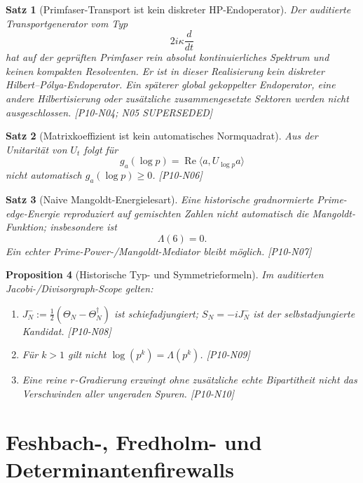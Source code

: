 \documentclass[11pt,a4paper]{amsart}
\newtheorem{theorem}{Satz}[section]
\newtheorem{proposition}[theorem]{Proposition}
\begin{document}
\begin{theorem}[Primfaser-Transport ist kein diskreter HP-Endoperator]
\label{thm:n04}
Der auditierte Transportgenerator vom Typ
\[
  2i\kappa\frac{d}{dt}
\]
hat auf der geprüften Primfaser rein absolut kontinuierliches Spektrum und
keinen kompakten Resolventen. Er ist in dieser Realisierung kein diskreter
Hilbert--Pólya-Endoperator. Ein späterer global gekoppelter Endoperator, eine
andere Hilbertisierung oder zusätzliche zusammengesetzte Sektoren werden nicht
ausgeschlossen. \emph{[P10-N04; N05 SUPERSEDED]}
\end{theorem}

\begin{theorem}[Matrixkoeffizient ist kein automatisches Normquadrat]
\label{thm:n06}
Aus der Unitarität von $U_t$ folgt für
\[
  g_a(\log p)=\operatorname{Re}\langle a,U_{\log p}a\rangle
\]
nicht automatisch $g_a(\log p)\ge0$. \emph{[P10-N06]}
\end{theorem}

\begin{theorem}[Naive Mangoldt-Energielesart]\label{thm:n07}
Eine historische gradnormierte Prime-edge-Energie reproduziert auf gemischten
Zahlen nicht automatisch die Mangoldt-Funktion; insbesondere ist
\[
  \Lambda(6)=0.
\]
Ein echter Prime-Power-/Mangoldt-Mediator bleibt möglich. \emph{[P10-N07]}
\end{theorem}

\begin{proposition}[Historische Typ- und Symmetrieformeln]\label{prop:n08n10}
Im auditierten Jacobi-/Divisorgraph-Scope gelten:
\begin{enumerate}
  \item $J_N^-:=\frac12(\Theta_N-\Theta_N^\dagger)$ ist schiefadjungiert;
        $S_N=-iJ_N^-$ ist der selbstadjungierte Kandidat. \emph{[P10-N08]}
  \item Für $k>1$ gilt nicht $\log(p^k)=\Lambda(p^k)$. \emph{[P10-N09]}
  \item Eine reine $r$-Gradierung erzwingt ohne zusätzliche echte
        Bipartitheit nicht das Verschwinden aller ungeraden Spuren.
        \emph{[P10-N10]}
\end{enumerate}
\end{proposition}

\section{Feshbach-, Fredholm- und Determinantenfirewalls}
\end{document}
